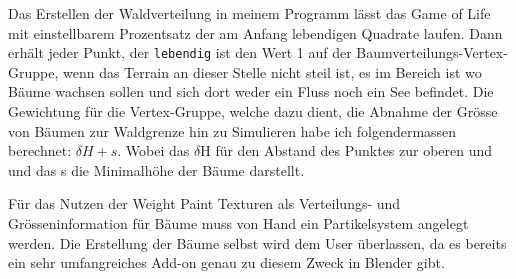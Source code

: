 \documentclass[12pt,twoside]{book}
\begin{document}
Das Erstellen der Waldverteilung in meinem Programm l\"asst das Game of Life mit einstellbarem Prozentsatz der am Anfang lebendigen Quadrate laufen.
Dann erh\"alt jeder Punkt, der \texttt{lebendig} ist den Wert 1 auf der Baumverteilungs-Vertex-Gruppe, wenn das Terrain an dieser Stelle nicht steil ist, es im Bereich ist wo B\"aume wachsen sollen und sich dort weder ein Fluss noch ein See befindet.
Die Gewichtung f\"ur die Vertex-Gruppe, welche dazu dient, die Abnahme der Gr\"osse von B\"aumen zur Waldgrenze hin zu Simulieren habe ich folgendermassen berechnet:
\( \delta H+s\).{ }
Wobei das \( \delta\)H f\"ur den Abstand des Punktes zur oberen und und das s die Minimalh\"ohe der B\"aume darstellt.

F\"ur das Nutzen der Weight Paint Texturen als Verteilungs- und Gr\"osseninformation f\"ur B\"aume muss von Hand ein Partikelsystem angelegt werden.
Die Erstellung der B\"aume selbst wird dem User \"uberlassen, da es bereits ein sehr umfangreiches Add-on genau zu diesem Zweck in Blender gibt.
\end{document}
